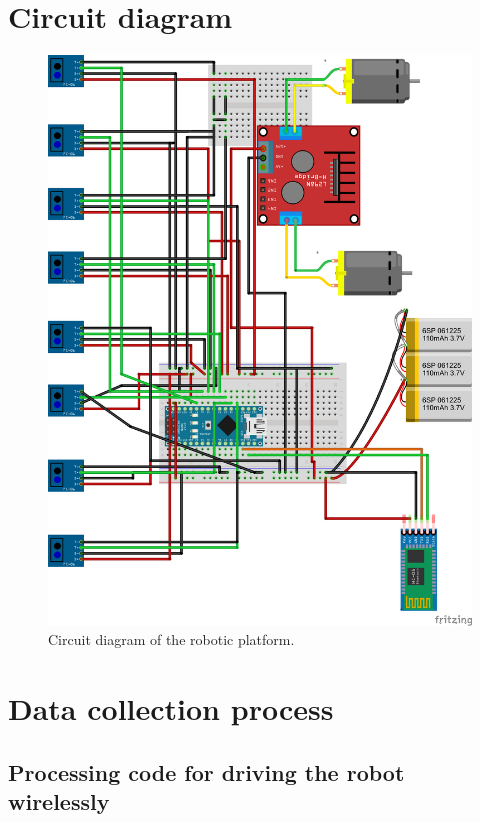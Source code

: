 \documentclass[14pt,a4paper]{extarticle}
\begin{document}
	\section{Circuit diagram}
	
		\begin{figure}[H]
			\includegraphics[center]{ckt_diagram.png}
			\caption{Circuit diagram of the robotic platform.}
		\end{figure}
	
	
	\section{Data collection process}
	
	\subsection{Processing code for driving the robot wirelessly}
	
\end{document}
